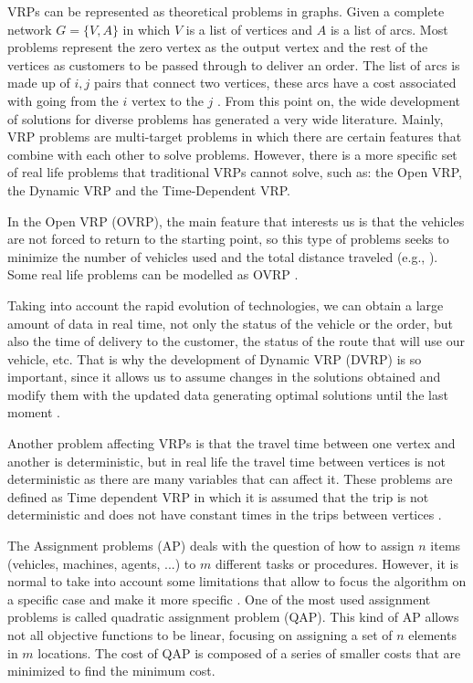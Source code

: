 \documentclass[letterpaper]{article} %
\begin{document}
VRPs can be represented as theoretical problems in graphs. Given a complete network $G = \{ V,A \}$ in which $V$ is a list of vertices and $A$ is a list of arcs. Most problems represent the zero vertex as the output vertex and the rest of the vertices as customers to be passed through to deliver an order. The list of arcs is made up of $i,j$ pairs that connect two vertices, these arcs have a cost associated with going from the $i$ vertex to the $j$ \cite{Eksioglu2009}. From this point on, the wide development of solutions for diverse problems has generated a very wide literature. Mainly, VRP problems are multi-target problems in which there are certain features that combine with each other to solve problems. However, there is a more specific set of real life problems that traditional VRPs cannot solve, such as: the Open VRP, the Dynamic VRP and the Time-Dependent VRP.

In the Open VRP (OVRP), the main feature that interests us is that the vehicles are not forced to return to the starting point, so this type of problems seeks to minimize the number of vehicles used and the total distance traveled (e.g., \cite{Subramanian2013,Cao2014}). Some real life problems can be modelled as OVRP \cite{Lopez-Sanchez2014,Salari2010}.

Taking into account the rapid evolution of technologies, we can obtain a large amount of data in real time, not only the status of the vehicle or the order, but also the time of delivery to the customer, the status of the route that will use our vehicle, etc. That is why the development of Dynamic VRP (DVRP) is so important, since it allows us to assume changes in the solutions obtained and modify them with the updated data generating optimal solutions until the last moment \cite{Barkaoui2013,Pillac2013}.

Another problem affecting VRPs is that the travel time between one vertex and another is deterministic, but in real life the travel time between vertices is not deterministic as there are many variables that can affect it. These problems are defined as Time dependent VRP in which it is assumed that the trip is not deterministic and does not have constant times in the trips between vertices \cite{Li2012}.

\quad

The Assignment problems (AP) deals with the question of how to assign $n$ items (vehicles, machines, agents, ...) to $m$ different tasks or procedures. However, it is normal to take into account some limitations that allow to focus the algorithm on a specific case and make it more specific \cite{Burkard2009}. One of the most used assignment problems is called quadratic assignment problem (QAP). This kind of AP allows not all objective functions to be linear, focusing on assigning a set of $n$ elements in $m$ locations. The cost of QAP is composed of a series of smaller costs that are minimized to find the minimum cost.
\end{document}
